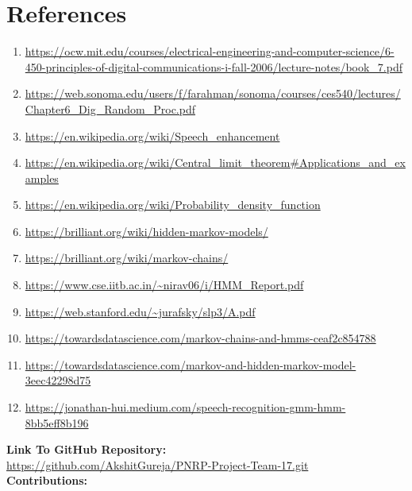 \documentclass[10pt,twocolumn,letterpaper]{article}
\newcommand\blankpage{%
    \null
    \thispagestyle{empty}%
    \addtocounter{page}{-1}%
    \newpage}
\begin{document}
\section{References}
\begin{enumerate}
    \item 
    \url{https://ocw.mit.edu/courses/electrical-engineering-and-computer-science/6-450-principles-of-digital-communications-i-fall-2006/lecture-notes/book_7.pdf}
    \item 
    \url{https://web.sonoma.edu/users/f/farahman/sonoma/courses/ces540/lectures/Chapter6_Dig_Random_Proc.pdf}
    \item \url{https://en.wikipedia.org/wiki/Speech_enhancement}
    \item \url{https://en.wikipedia.org/wiki/Central_limit_theorem#Applications_and_examples}
    \item \url{https://en.wikipedia.org/wiki/Probability_density_function}
    \item \url{https://brilliant.org/wiki/hidden-markov-models/}
    \item \url{https://brilliant.org/wiki/markov-chains/}
    \item \url{https://www.cse.iitb.ac.in/~nirav06/i/HMM_Report.pdf}
    \item \url{https://web.stanford.edu/~jurafsky/slp3/A.pdf}
    \item \url{https://towardsdatascience.com/markov-chains-and-hmms-ceaf2c854788}
    \item \url{https://towardsdatascience.com/markov-and-hidden-markov-model-3eec42298d75}
    \item \url{https://jonathan-hui.medium.com/speech-recognition-gmm-hmm-8bb5eff8b196}
    
\end{enumerate}
\newpage
\pagebreak
\afterpage{\blankpage}
\afterpage{\blankpage}
\textbf{\Large Link To GitHub Repository:}\\
\url{https://github.com/AkshitGureja/PNRP-Project-Team-17.git}\\
\newline
\textbf{\Large Contributions:}
\end{document}
